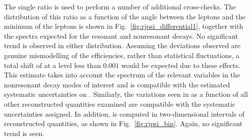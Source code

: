 The \rjpsi single ratio is used to perform a number of additional cross-checks. The distribution of this ratio as a function of the angle between the leptons and the minimum \pt of the leptons is shown in Fig.~\ref{fig:rjpsi_differential1}, together with the spectra expected for the resonant and nonresonant decays.
No significant trend is observed in either \rjpsi distribution. Assuming the deviations observed are genuine mismodelling of the efficiencies, rather than statistical fluctuations, a total shift of \RK at a level less than $0.001$ would be expected due to these effects. This estimate takes into account the spectrum of the relevant variables in the nonresonant decay modes of interest and is compatible with the estimated systematic uncertainties on \RK. Similarly, the variations seen in \rjpsi as a function of all other reconstructed quantities examined are compatible with the systematic uncertainties assigned. In addition, \rjpsi is computed in two-dimensional intervals of reconstructed quantities, as shown in Fig.~\ref{fig:rjpsi_bin}. Again, no significant trend is seen.
 
